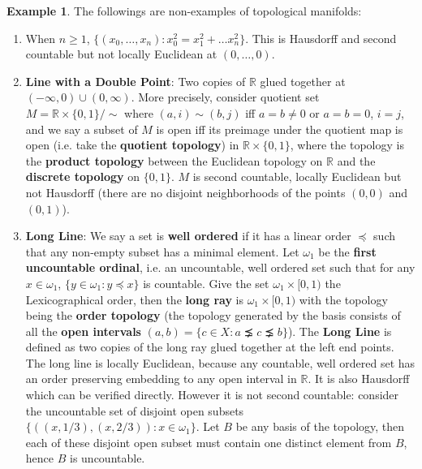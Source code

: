 \documentclass{article}
\theoremstyle{definition}
\newtheorem{exm}[thm]{Example}
\begin{document}
\begin{exm}
    The followings are non-examples of topological manifolds:
    \begin{enumerate}
        \item When $n\geq 1$, $\{(x_0, \dots, x_n): x_0^2=x_1^2+\dots x_n^2\}$. This is Hausdorff and second countable but not locally Euclidean at $(0, \dots, 0)$.
        \item {\bf Line with a Double Point}: Two copies of $\mathbb{R}$ glued together at $(-\infty, 0)\cup (0, \infty)$. More precisely, consider quotient set $M=\mathbb{R}\times \{0, 1\}/\sim$ where $(a, i)\sim (b, j)$ iff $a=b\not=0$ or $a=b=0$, $i=j$, and we say a subset of $M$ is open iff its preimage under the quotient map is open (i.e. take the {\bf quotient topology}) in $\mathbb{R}\times \{0, 1\}$, where the topology is the {\bf product topology} between the Euclidean topology on $\mathbb{R}$ and the {\bf discrete topology} on $\{0, 1\}$. $M$ is second countable, locally Euclidean but not Hausdorff (there are no disjoint neighborhoods of the points $(0, 0)$ and $(0, 1)$).
        \item {\bf Long Line}: We say a set is {\bf well ordered} if it has a linear order $\preceq$ such that any non-empty subset has a minimal element. Let $\omega_1$ be the {\bf first uncountable ordinal}, i.e. an uncountable, well ordered set such that for any $x\in\omega_1$, $\{y\in\omega_1: y\preceq x\}$ is countable. Give the set $\omega_1\times [0, 1)$ the Lexicographical order, then the {\bf long ray} is $\omega_1\times [0, 1)$ with the topology being the {\bf order topology} (the topology generated by the basis consists of all the {\bf open intervals} $(a, b)=\{c\in X: a\precneq c\precneq b\}$). The {\bf Long Line} is defined as two copies of the long ray glued together at the left end points.\\

        The long line is locally Euclidean, because any countable, well ordered set has an order preserving embedding to any open interval in $\mathbb{R}$. It is also Hausdorff which can be verified directly. However it is not second countable: consider the uncountable set of disjoint open subsets $\{((x, 1/3), (x, 2/3)): x\in\omega_1\}$. Let $B$ be any basis of the topology, then each of these disjoint open subset must contain one distinct element from $B$, hence $B$ is uncountable.
    \end{enumerate}
\end{exm}
\end{document}
